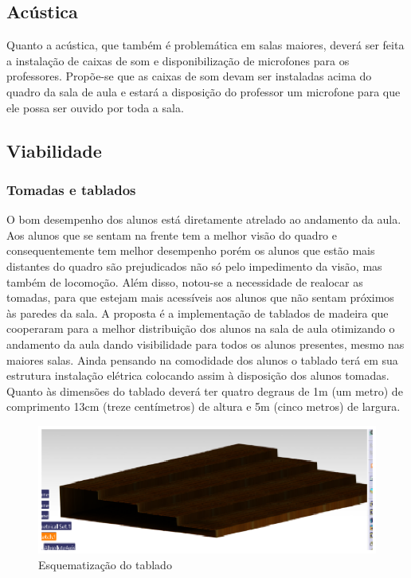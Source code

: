 \subsection{Acústica}
Quanto a acústica, que também é problemática em salas maiores, deverá ser feita a instalação de caixas de som e disponibilização de microfones para os professores. Propõe-se que as caixas de som devam ser instaladas acima do quadro da sala de aula e estará a disposição do professor um microfone para que ele possa ser ouvido por toda a sala.

\subsection{Viabilidade}

\subsubsection{Tomadas e tablados}
O bom desempenho dos alunos está diretamente atrelado ao andamento da aula. Aos alunos que se sentam na frente tem a melhor visão do quadro e consequentemente tem melhor desempenho porém os alunos que estão mais distantes do quadro são prejudicados não só pelo impedimento da visão, mas também de locomoção. Além disso, notou-se a necessidade de realocar as tomadas, para que estejam mais acessíveis aos alunos que não sentam próximos às paredes da sala.
A proposta é a implementação de tablados de madeira que cooperaram para a melhor distribuição dos alunos na sala de aula otimizando o andamento da aula dando visibilidade para todos os alunos presentes, mesmo nas maiores salas. Ainda pensando na comodidade dos alunos o tablado terá em sua estrutura instalação elétrica colocando assim à disposição dos alunos tomadas.
Quanto às dimensões do tablado deverá ter quatro degraus de 1m (um metro) de comprimento 13cm (treze centímetros) de altura e 5m (cinco metros) de largura. 

\begin{figure}[!ht]
\centering
\includegraphics[keepaspectratio=true,scale=1]{figuras/Tablado.eps}
\caption{Esquematização do tablado}
\end{figure}


